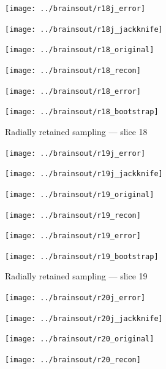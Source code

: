 \documentclass[article]{jdssv}
\begin{document}
\begin{appendix}
\begin{figure}
\begin{centering}
\parbox{\imsize}{\texttt{[image: ../brainsout/r18j\_error]}}
\parbox{\imsize}{\texttt{[image: ../brainsout/r18j\_jackknife]}}

\vspace{\vertsep}

\parbox{\imsize}{\texttt{[image: ../brainsout/r18\_original]}}
\parbox{\imsize}{\texttt{[image: ../brainsout/r18\_recon]}}

\vspace{\vertsep}

\parbox{\imsize}{\texttt{[image: ../brainsout/r18\_error]}}
\parbox{\imsize}{\texttt{[image: ../brainsout/r18\_bootstrap]}}

\end{centering}
\caption{Radially retained sampling --- slice 18}
\end{figure}


\begin{figure}
\begin{centering}

\parbox{\imsize}{\texttt{[image: ../brainsout/r19j\_error]}}
\parbox{\imsize}{\texttt{[image: ../brainsout/r19j\_jackknife]}}

\vspace{\vertsep}

\parbox{\imsize}{\texttt{[image: ../brainsout/r19\_original]}}
\parbox{\imsize}{\texttt{[image: ../brainsout/r19\_recon]}}

\vspace{\vertsep}

\parbox{\imsize}{\texttt{[image: ../brainsout/r19\_error]}}
\parbox{\imsize}{\texttt{[image: ../brainsout/r19\_bootstrap]}}

\end{centering}
\caption{Radially retained sampling --- slice 19}
\end{figure}


\begin{figure}
\begin{centering}

\parbox{\imsize}{\texttt{[image: ../brainsout/r20j\_error]}}
\parbox{\imsize}{\texttt{[image: ../brainsout/r20j\_jackknife]}}

\vspace{\vertsep}

\parbox{\imsize}{\texttt{[image: ../brainsout/r20\_original]}}
\parbox{\imsize}{\texttt{[image: ../brainsout/r20\_recon]}}

\vspace{\vertsep}


\end{centering}
\end{figure}
\end{appendix}
\end{document}
